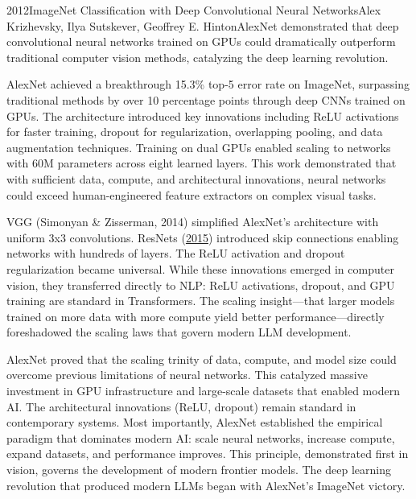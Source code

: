 
\begin{papersummary}{2012}{ImageNet Classification with Deep Convolutional Neural Networks}{Alex Krizhevsky, Ilya Sutskever, Geoffrey E. Hinton}{AlexNet demonstrated that deep convolutional neural networks trained on GPUs could dramatically outperform traditional computer vision methods, catalyzing the deep learning revolution.}

AlexNet achieved a breakthrough 15.3\% top-5 error rate on ImageNet, surpassing traditional methods by over 10 percentage points through deep CNNs trained on GPUs. The architecture introduced key innovations including ReLU activations for faster training, dropout for regularization, overlapping pooling, and data augmentation techniques. Training on dual GPUs enabled scaling to networks with 60M parameters across eight learned layers. This work demonstrated that with sufficient data, compute, and architectural innovations, neural networks could exceed human-engineered feature extractors on complex visual tasks.

VGG (Simonyan \& Zisserman, 2014) simplified AlexNet's architecture with uniform 3x3 convolutions. ResNets (\hyperref[paper:he-2015-resnet]{2015}) introduced skip connections enabling networks with hundreds of layers. The ReLU activation and dropout regularization became universal. While these innovations emerged in computer vision, they transferred directly to NLP: ReLU activations, dropout, and GPU training are standard in Transformers. The scaling insight—that larger models trained on more data with more compute yield better performance—directly foreshadowed the scaling laws that govern modern LLM development.

AlexNet proved that the scaling trinity of data, compute, and model size could overcome previous limitations of neural networks. This catalyzed massive investment in GPU infrastructure and large-scale datasets that enabled modern AI. The architectural innovations (ReLU, dropout) remain standard in contemporary systems. Most importantly, AlexNet established the empirical paradigm that dominates modern AI: scale neural networks, increase compute, expand datasets, and performance improves. This principle, demonstrated first in vision, governs the development of modern frontier models. The deep learning revolution that produced modern LLMs began with AlexNet's ImageNet victory.

\end{papersummary}
